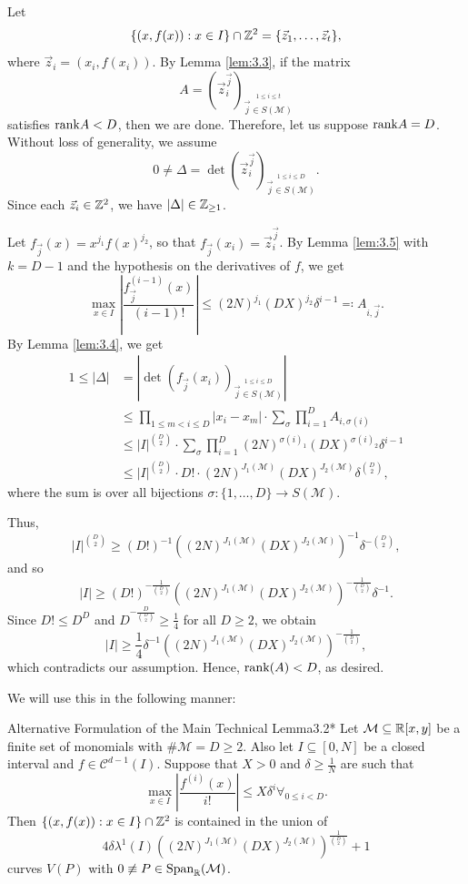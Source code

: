 \documentclass{Vorlesungstemplate_English} %
\begin{document}
\begin{pf}
  Let
  \[ \{ (x,f(x)): x \in I\} \cap \mathbb{Z}^2 = \{ \vec z_1, \dots, \vec z_t\},\]
  where $\vec z_i=(x_i,f(x_i))$.
  By Lemma \ref{lem:3.3}, if the matrix
  \[ A = (\vec z_i^{\vec j})_{\stackrel{1 \leq i \leq t}{\vec j \in S(\mathcal{M})}}\]
  satisfies $\text{rank} A < D$, then we are done. Therefore, let us suppose $\text{rank} A=D$. Without loss of generality, we assume
  \[ 0 \neq \Delta = \det(\vec z_i^{\vec j})_{\stackrel{1 \leq i \leq D}{\vec j \in S(\mathcal{M})}}.\]
  Since each $\vec z_i \in \mathbb{Z}^2$, we have $|\Delta| \in \mathbb{Z}_{\geq 1}$.

  Let $f_{\vec j}(x)=x^{j_1}f(x)^{j_2}$, so that $f_{\vec j}(x_i)=\vec z_i^{\vec j}$. By Lemma \ref{lem:3.5} with $k=D-1$ and the hypothesis on the derivatives of $f$, we get
  \[ \max_{x \in I}\left|\frac{f_{\vec j}^{(i-1)}(x)}{(i-1)!}\right| \leq (2N)^{j_1}(DX)^{j_2}\delta^{i-1} \eqqcolon A_{i,\vec j}.\]
  By Lemma \ref{lem:3.4}, we get
  \begin{align*}
    1 \leq |\Delta|
    &= \left|\det(f_{\vec j}(x_i))_{\stackrel{1 \leq i \leq D}{\vec j \in S(\mathcal{M})}}\right| \\
    &\leq \prod_{1 \leq m < i \leq D}|x_i-x_m|\cdot \sum_{\sigma}\prod_{i=1}^D A_{i,\sigma(i)} \\
    &\leq |I|^{\binom{D}{2}}\cdot \sum_{\sigma}\prod_{i=1}^D (2N)^{\sigma(i)_1}(DX)^{\sigma(i)_2}\delta^{i-1} \\
    &\leq |I|^{\binom{D}{2}}\cdot D!\cdot (2N)^{J_1(\mathcal{M})}(DX)^{J_2(\mathcal{M})}\delta^{\binom{D}{2}},
  \end{align*}
  where the sum is over all bijections $\sigma:\{1,\dots,D\}\to S(\mathcal{M})$.

  Thus,
  \[ |I|^{\binom{D}{2}} \geq (D!)^{-1}\left((2N)^{J_1(\mathcal{M})}(DX)^{J_2(\mathcal{M})}\right)^{-1}\delta^{-\binom{D}{2}},\]
  and so
  \[ |I| \geq (D!)^{-\frac{1}{\binom{D}{2}}}\left((2N)^{J_1(\mathcal{M})}(DX)^{J_2(\mathcal{M})}\right)^{-\frac{1}{\binom{D}{2}}}\delta^{-1}.\]
  Since $D! \leq D^D$ and $D^{-\frac{D}{\binom{D}{2}}} \geq \frac{1}{4}$ for all $D \geq 2$, we obtain
  \[ |I| \geq \frac{1}{4}\delta^{-1}\left((2N)^{J_1(\mathcal{M})}(DX)^{J_2(\mathcal{M})}\right)^{-\frac{1}{\binom{D}{2}}},\]
  which contradicts our assumption. Hence, $\text{rank}(A)<D$, as desired.
\end{pf}
We will use this in the following manner:
\begin{lemma}{Alternative Formulation of the Main Technical Lemma}{3.2*}
  Let $\mathcal{M} \subseteq \mathbb{R}[x,y]$ be a finite set of monomials with $\# \mathcal{M} = D \geq 2$. Also let $I \subseteq [0,N]$ be a closed interval and $f \in \mathcal{C}^{d-1}(I)$. Suppose that $X > 0$ and $\delta \geq \frac{1}{N}$ are such that
  \[ \max_{x \in I}\left| \frac{f^{(i)}(x)}{i!}\right| \leq X\delta^i \forall_{0 \leq i < D}.\]
  Then $\{ (x,f(x)): x \in I\} \cap \mathbb{Z}^2$ is contained in the union of
  \[ 4\delta\lambda^1(I)((2N)^{J_1(\mathcal{M})}(DX)^{J_2(\mathcal{M})})^{\frac{1}{\binom{D}{2}}} + 1\]
  curves $V(P)$ with $0 \not\equiv P \in \text{Span}_{\mathbb{R}}(\mathcal{M})$.
\end{lemma}
\end{document}
